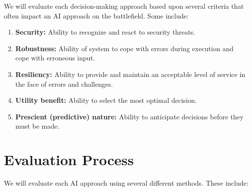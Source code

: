 \documentclass{article}
\begin{document}
We will evaluate each decision-making approach based upon several criteria that often impact an AI approach on the battlefield. Some include:
\begin{enumerate}[noitemsep]
    
	\item \textbf{Security:} Ability to recognize and react to security threats.
	\item \textbf{Robustness:} Ability of system to cope with errors during execution and cope with erroneous input.
	\item \textbf{Resiliency:} Ability to provide and maintain an acceptable level of service in the face of errors and challenges.


    \item \textbf{Utility benefit:} Ability to select the most optimal decision.

    \item \textbf{Prescient (predictive) nature:} Ability to anticipate decisions before they must be made.



\end{enumerate}


\section{Evaluation Process} %


We will evaluate each AI approach using several different methods. These include:
\end{document}
